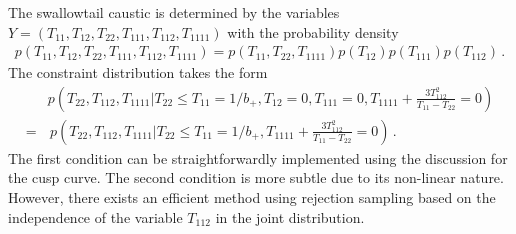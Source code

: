 \documentclass[a4paper, 11pt]{article}
\begin{document}
The swallowtail caustic is determined by the variables $Y=(T_{11},T_{12},T_{22},T_{111},T_{112},T_{1111})$ with the probability density
\begin{align}
p(T_{11},T_{12},T_{22},T_{111},T_{112},T_{1111})=p(T_{11},T_{22},T_{1111})p(T_{12})p(T_{111})p(T_{112})\,.
\end{align}
The constraint distribution takes the form
\begin{align}
&p\left(T_{22},T_{112},T_{1111}|T_{22}\leq T_{11}=1/b_+, T_{12}=0,T_{111}=0,T_{1111}+\frac{3T_{112}^2}{T_{11}-T_{22}}=0\right)\\
=&\, p\left(T_{22},T_{112}, T_{1111}|T_{22}\leq T_{11}=1/b_+, T_{1111}+\frac{3T_{112}^2}{T_{11}-T_{22}}=0\right)\,.
\end{align}
The first condition can be straightforwardly implemented using the discussion for the cusp curve. The second condition is more subtle due to its non-linear nature. However, there exists an efficient method using rejection sampling based on the independence of the variable $T_{112}$ in the joint distribution.
\end{document}
